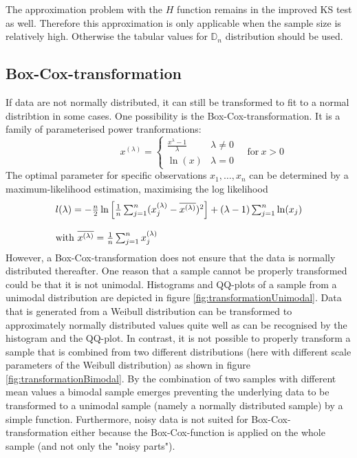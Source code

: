 \documentclass[a4paper, 12pt, titlepage, headsepline, listof = totoc, bibliography = totoc, numbers = noenddot]{scrartcl}
\begin{document}
The approximation problem with the $H$ function remains in the improved KS test
as well. Therefore this approximation is only applicable when 
the sample size is relatively high. Otherwise the tabular values for
$\mathbb{D}_n$ distribution should be used. 



\subsection{Box-Cox-transformation}\label{sec:boxcox-theory}

If data are not normally distributed, it can still be transformed to fit to a normal distribtion in some cases. One possibility is the Box-Cox-transformation. It is a family of parameterised power tranformations:
\[
  \phantom{\quad\mbox{for}\ x > 0}
   x^{(\lambda)} =
   \left\{ 
    \begin{array}{cl}
                 \frac{x^\lambda - 1}{\lambda} & \lambda \neq 0\\
                 \ln(x) & \lambda = 0
    \end{array}
   \right.
   \quad\mbox{for}\ x > 0
\]
The optimal parameter for specific observations $x_1, \dots, x_n$ can be determined by a maximum-likelihood estimation, maximising the log likelihood
\[
\begin{array}{l}
\vspace{12pt}
   l(\lambda) = - \frac{n}{2}\ln\left[\frac{1}{n}\sum_{j=1}^{n}(x_j^{(\lambda)} - \overline{x^{(\lambda)}})^2\right] + (\lambda - 1) \sum_{j=1}^{n}\ln(x_j)\\
   \mbox{with}\ \overline{x^{(\lambda)}} = \frac{1}{n} \sum_{j=1}^{n}x_j^{(\lambda)}
\end{array}
\]
However, a Box-Cox-transformation does not ensure that the data is normally distributed thereafter. One reason that a sample cannot be properly transformed could be that it is not unimodal. Histograms and QQ-plots of a sample from a unimodal distribution are depicted in figure \ref{fig:transformationUnimodal}. Data that is generated from a Weibull distribution can be transformed to approximately normally distributed values quite well as can be recognised by the histogram and the QQ-plot. In contrast, it is not possible to properly transform a sample that is combined from two different distributions (here with different scale parameters of the Weibull distribution) as shown in figure \ref{fig:transformationBimodal}. By the combination of two samples with different mean values a bimodal sample emerges preventing the underlying data to be transformed to a unimodal sample (namely a normally distributed sample) by a simple function. Furthermore, noisy data is not suited for Box-Cox-transformation either because the Box-Cox-function is applied on the whole sample (and not only the "noisy parts").
\newpage
\phantom{.}
\vfill
\end{document}
